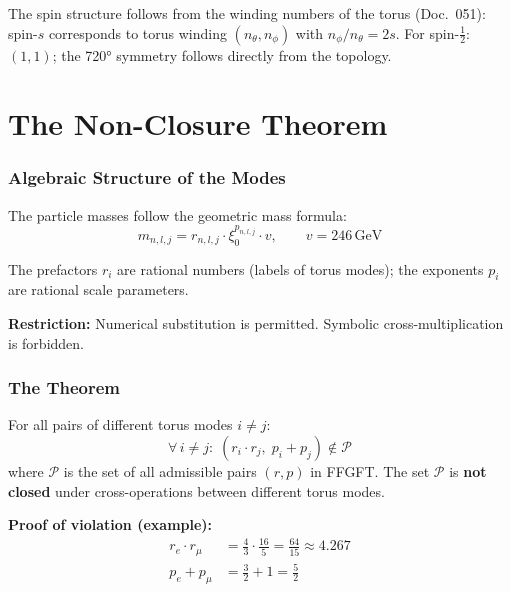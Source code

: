 The spin structure follows from the winding numbers of the torus
(Doc.~051): spin-$s$ corresponds to torus winding $(n_\theta, n_\phi)$
with $n_\phi/n_\theta = 2s$. For spin-$\tfrac{1}{2}$: $(1,1)$;
the 720° symmetry follows directly from the topology.

\part{The Non-Closure Theorem}

\section{Algebraic Structure of the Modes}

The particle masses follow the geometric mass formula:
\begin{equation}
  m_{n,l,j} = r_{n,l,j} \cdot \xi_0^{p_{n,l,j}} \cdot v,
  \qquad v = 246\,\text{GeV}
  \label{eq:massformula}
\end{equation}

The prefactors $r_i$ are rational numbers (labels of torus modes);
the exponents $p_i$ are rational scale parameters.

\textbf{Restriction:} Numerical substitution is permitted.
Symbolic cross-multiplication is forbidden.

\section{The Theorem}

\begin{tcolorbox}[colback=blue!5, colframe=blue!60!black, boxrule=0.8pt,
  arc=3pt, left=4mm, right=4mm,
  title={Non-Closure Theorem of FFGFT Torus Modes}]
For all pairs of different torus modes $i \neq j$:
\[
  \forall\, i \neq j:\;
  (r_i \cdot r_j,\; p_i + p_j) \notin \mathcal{P}
\]
where $\mathcal{P}$ is the set of all admissible pairs $(r,p)$ in FFGFT.
The set $\mathcal{P}$ is \textbf{not closed} under cross-operations
between different torus modes.
\end{tcolorbox}

\textbf{Proof of violation (example):}
\begin{align*}
  r_e \cdot r_\mu &= \frac{4}{3} \cdot \frac{16}{5} = \frac{64}{15}
  \approx 4.267 \\
  p_e + p_\mu &= \frac{3}{2} + 1 = \frac{5}{2}
\end{align*}

